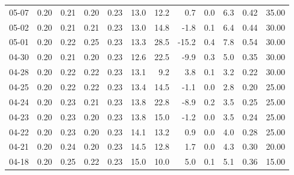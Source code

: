 \begin{threeparttable}
{\begin{tabular}{lrrrrrrrrrrr}
  05-07 &          0.20 &          0.21 &          0.20 &        0.23 &                13.0 &                12.2 &        0.7 &                 0.0 &              6.3 &            0.42 &                  35.00 \\
  05-02 &          0.20 &          0.21 &          0.21 &        0.23 &                13.0 &                14.8 &       -1.8 &                 0.1 &              6.4 &            0.44 &                  30.00 \\
  05-01 &          0.20 &          0.22 &          0.25 &        0.23 &                13.3 &                28.5 &      -15.2 &                 0.4 &              7.8 &            0.54 &                  30.00 \\
  04-30 &          0.20 &          0.21 &          0.20 &        0.23 &                12.6 &                22.5 &       -9.9 &                 0.3 &              5.0 &            0.35 &                  30.00 \\
  04-28 &          0.20 &          0.22 &          0.22 &        0.23 &                13.1 &                 9.2 &        3.8 &                 0.1 &              3.2 &            0.22 &                  30.00 \\
  04-25 &          0.20 &          0.22 &          0.22 &        0.23 &                13.4 &                14.5 &       -1.1 &                 0.0 &              2.8 &            0.20 &                  25.00 \\
  04-24 &          0.20 &          0.23 &          0.21 &        0.23 &                13.8 &                22.8 &       -8.9 &                 0.2 &              3.5 &            0.25 &                  25.00 \\
  04-23 &          0.20 &          0.23 &          0.20 &        0.23 &                13.8 &                15.0 &       -1.2 &                 0.0 &              3.5 &            0.24 &                  25.00 \\
  04-22 &          0.20 &          0.23 &          0.20 &        0.23 &                14.1 &                13.2 &        0.9 &                 0.0 &              4.0 &            0.28 &                  25.00 \\
  04-21 &          0.20 &          0.24 &          0.20 &        0.23 &                14.5 &                12.8 &        1.7 &                 0.0 &              4.3 &            0.30 &                  20.00 \\
  04-18 &          0.20 &          0.25 &          0.22 &        0.23 &                15.0 &                10.0 &        5.0 &                 0.1 &              5.1 &            0.36 &                  15.00 \\

\end{tabular}}
\end{threeparttable}
